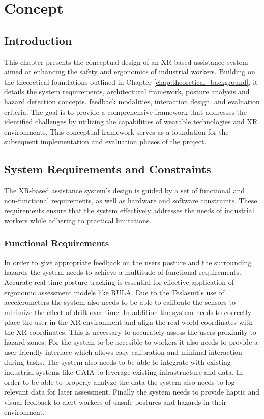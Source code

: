 \chapter{Concept}
\label{chap:concept}

\section{Introduction}
This chapter presents the conceptual design of an XR-based assistance system aimed at enhancing the safety and ergonomics of industrial workers. Building on the theoretical foundations outlined in Chapter \ref{chap:theoretical_background}, it details the system requirements, architectural framework, posture analysis and hazard detection concepts, feedback modalities, interaction design, and evaluation criteria. The goal is to provide a comprehensive framework that addresses the identified challenges by utilizing the capabilities of wearable technologies and XR environments. This conceptual framework serves as a foundation for the subsequent implementation and evaluation phases of the project.

\section{System Requirements and Constraints}
The XR-based assistance system's design is guided by a set of functional and non-functional requirements, as well as hardware and software constraints.
These requirements ensure that the system effectively addresses the needs of industrial workers while adhering to practical limitations.

\subsection{Functional Requirements}
In order to give appropriate feedback on the users posture and the surrounding hazards the system needs to achieve a multitude of functional requirements. 
Accurate real-time posture tracking is essential for effective application of ergonomic assessment models like RULA. Due to the Teslasuit's use of accelerometers the system also needs to be able to calibrate the sensors to minimize the effect of drift over time. In addition the system needs to correctly place the user in the XR environment and align the real-world coordinates with the XR coordinates. This is necessary to accurately assess the users proximity to hazard zones. For the system to be accesible to workers it also needs to provide a user-friendly interface which allows easy calibration and minimal interaction during tasks. The system also needs to be able to integrate with existing industrial systems like GAIA to leverage existing infrastructure and data. In order to be able to properly analyze the data the system also needs to log relevant data for later assessment. Finally the system needs to provide haptic and visual feedback to alert workers of unsafe postures and hazards in their environment.

